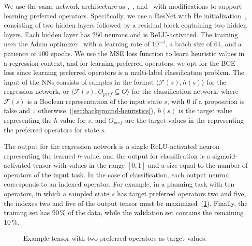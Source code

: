 \documentclass[ppgc,diss,english]{iiufrgs}
\begin{document}
We use the same network architecture as \citet{Ferber.etal/2022},~\citet{OToole/2022}, and~\citet{Bettker.etal/2022} with modifications to support learning preferred operators. Specifically, we use a ResNet with He initialization~\cite{He.etal/2015}, consisting of two hidden layers followed by a residual block containing two hidden layers.
Each hidden layer has $250$ neurons and is ReLU-activated.
The training uses the Adam optimizer~\cite{Kingma.Ba/2015} with a learning rate of $10^{-4}$, a batch size of $64$, and a patience of $100$ epochs.
We use the MSE loss function to learn heuristic values in a regression context, and for learning preferred operators, we opt for the BCE loss since learning preferred operators is a multi-label classification problem.
The input of the NNs consists of samples in the format $\langle\mathcal{F}(s), h(s)\rangle$ for the regression network, or $\langle\mathcal{F}(s), O_{pref} \subseteq O\rangle$ for the classification network,
where $\mathcal{F}(s)$ is a Boolean representation of the input state $s$, with $0$ if a proposition is false and $1$ otherwise~(\cref{sec:background-heuristics}), $h(s)$ is the target value representing the $h$-value for $s$, and $O_{pref}$ are the target values in the representing the preferred operators for state $s$.

The output for the regression network is a single ReLU-activated neuron representing the learned $h$-value, and the output for classification is a sigmoid-activated tensor with values in the range $[0, 1]$ and a size equal to the number of operators of the input task.
In the case of classification, each output neuron corresponds to an indexed operator. For example, in a planning task with ten operators, in which a sampled state $s$ has target preferred operators two and five, the indexes two and five of the output tensor must be maximized~(\cref{fig:po-tensor}). Finally, the training set has $90\,\%$ of the data, while the validation set contains the remaining $10\,\%$.

\begin{figure}[tb]
\caption[]{Example tensor with two preferred operators as target values.}
\vspace{\baselineskip}
\centering
{}
\label{fig:po-tensor}
\end{figure}
\end{document}
